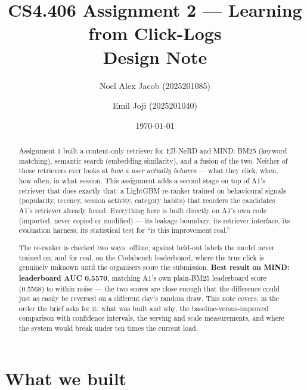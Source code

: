 \documentclass[11pt,a4paper]{article}
\title{\textbf{CS4.406 Assignment 2 --- Learning from Click-Logs}\\[2pt]
\large Design Note}
\author{Noel Alex Jacob (2025201085) \and Emil Joji (2025201040)}
\date{\today}
\begin{document}
\maketitle

\begin{abstract}
\noindent
Assignment 1 built a content-only retriever for EB-NeRD and MIND: BM25 (keyword matching),
semantic search (embedding similarity), and a fusion of the two. Neither of those retrievers ever
looks at \emph{how a user actually behaves} --- what they click, when, how often, in what session.
This assignment adds a second stage on top of A1's retriever that does exactly that: a LightGBM
re-ranker trained on behavioural signals (popularity, recency, session activity, category habits)
that reorders the candidates A1's retriever already found. Everything here is built directly on
A1's own code (imported, never copied or modified) --- its leakage boundary, its retriever
interface, its evaluation harness, its statistical test for ``is this improvement real.''

The re-ranker is checked two ways: offline, against held-out labels the model never trained on,
and for real, on the Codabench leaderboard, where the true click is genuinely unknown until the
organisers score the submission. \textbf{Best result on MIND: leaderboard AUC 0.5570}, matching
A1's own plain-BM25 leaderboard score (0.5568) to within noise --- the two scores are close enough
that the difference could just as easily be reversed on a different day's random draw. This note
covers, in the order the brief asks for it: what was built and why, the baseline-versus-improved
comparison with confidence intervals, the serving and scale measurements, and where the system
would break under ten times the current load.
\end{abstract}

\tableofcontents
\bigskip

\section{What we built}
\end{document}
